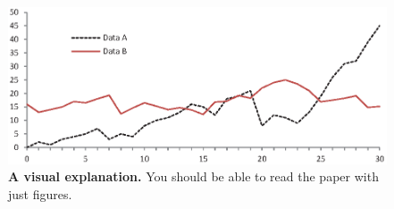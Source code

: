\begin{figure}[h]
  \centering
  \vspace{-0.2cm}
  \includegraphics[width=\linewidth]{img/fig1.eps}
  \caption
  { 
    \textbf{A visual explanation.} You should be able to read the paper with just figures.
  }
  \label{fig:overview}
\end{figure}